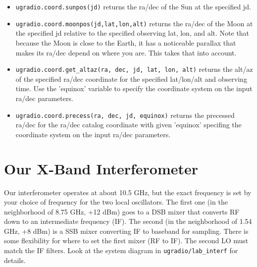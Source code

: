 \documentclass[11pt,preprint]{aastex}
\begin{document}
\begin{itemize}

\item \verb+ugradio.coord.sunpos(jd)+ returns the ra/dec of the Sun at the specified jd.

\item \verb+ugradio.coord.moonpos(jd,lat,lon,alt)+ returns the ra/dec of the Moon at
the specified jd relative to the specified observing lat, lon, and alt.
Note that because the Moon is close to the Earth, it has a noticeable
parallax that makes its ra/dec depend on where you are.  This takes that
into account.

\item \verb+ugradio.coord.get_altaz(ra, dec, jd, lat, lon, alt)+ returns the alt/az
of the specified ra/dec coordinate for the specified lat/lon/alt and
observing time.  Use the 'equinox' variable to specify the coordinate
system on the input ra/dec parameters.

\item \verb+ugradio.coord.precess(ra, dec, jd, equinox)+ returns the precessed ra/dec
for the ra/dec catalog coordinate with given 'equinox' specifing the coordinate
system on the input ra/dec parameters.



\end{itemize}

\section{Our X-Band Interferometer}

\noindent
Our interferometer operates at about 10.5 GHz,
but the exact frequency is set by your choice of frequency for
the two local oscillators. The first one (in the neighborhood of 8.75 GHz,
+12 dBm) goes to a DSB mixer that converts RF down to an intermediate 
frequency (IF). The second (in the neighborhood of 1.54 GHz, +8 dBm)
is a SSB mixer converting IF to baseband for sampling. There is some
flexibility for where to set the first mixer (RF to IF). The second LO
must match the IF filters. Look at the system diagram in
{\tt ugradio/lab\_interf} for details.
\end{document}

